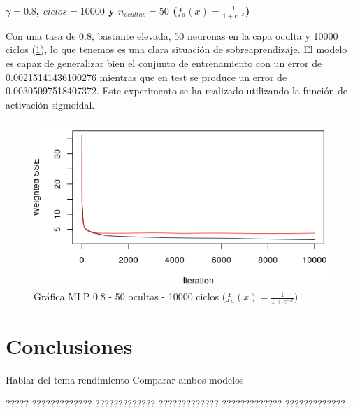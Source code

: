 \documentclass[11pt,spanish,listoffigures,listoftables]{tfgetsinf}
\begin{document}
\par \textbf{$\gamma = 0.8$, $ciclos = 10000$ y $n_{ocultas} = 50$ ($f_{a}(x) = \frac{1}{1+e^{-x}}$)}

\par Con una tasa de 0.8, bastante elevada, 50 neuronas en la capa oculta y 10000 ciclos (\ref{fig:500810000sig}), lo que tenemos es una clara situación de sobreaprendizaje. El modelo es capaz de generalizar bien el conjunto de entrenamiento con un error de 0.00215141436100276 mientras que en test se produce un error de 0.00305097518407372. Este experimento se ha realizado utilizando la función de activación sigmoidal.

\begin{figure}[H]
\centering
\includegraphics[scale=0.5]{500810000sig}
\caption{Gráfica MLP 0.8 - 50 ocultas - 10000 ciclos ($f_{a}(x) = \frac{1}{1+e^{-x}}$)}\label{fig:500810000sig}
\end{figure}



\chapter{Conclusiones}

Hablar del tema rendimiento
Comparar ambos modelos

????? ????????????? ????????????? ????????????? ????????????? ????????????? 

\end{document}
